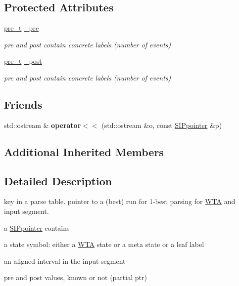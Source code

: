 \subsection*{Protected Attributes}
\begin{DoxyCompactItemize}
\item 
\mbox{\hyperlink{group__general_ga092fe8b972dfa977c2a0886720a7731e}{pre\+\_\+t}} \mbox{\hyperlink{classSIPpointer_acfbd9084ef6db9de5776896247ac71c8}{\+\_\+pre}}
\begin{DoxyCompactList}\small\item\em pre and post contain concrete labels (number of events) \end{DoxyCompactList}\item 
\mbox{\hyperlink{group__general_ga092fe8b972dfa977c2a0886720a7731e}{pre\+\_\+t}} \mbox{\hyperlink{classSIPpointer_ab8ae3255dd4e6f898db0c5e49c860f28}{\+\_\+post}}
\begin{DoxyCompactList}\small\item\em pre and post contain concrete labels (number of events) \end{DoxyCompactList}\end{DoxyCompactItemize}
\subsection*{Friends}
\begin{DoxyCompactItemize}
\item 
\mbox{\label{classSIPpointer_a7576e987b23cc05f8c50602b5fbe5fe3}} 
std\+::ostream \& {\bfseries operator$<$$<$} (std\+::ostream \&o, const \mbox{\hyperlink{classSIPpointer}{S\+I\+Ppointer}} \&p)
\end{DoxyCompactItemize}
\subsection*{Additional Inherited Members}


\subsection{Detailed Description}
key in a parse table. pointer to a (best) run for 1-\/best parsing for \mbox{\hyperlink{classWTA}{W\+TA}} and input segment. 

a \mbox{\hyperlink{classSIPpointer}{S\+I\+Ppointer}} contains
\begin{DoxyItemize}
\item a state symbol\+: either a \mbox{\hyperlink{classWTA}{W\+TA}} state or a meta state or a leaf label
\item an aligned interval in the input segment
\item pre and post values, known or not (partial ptr) 
\end{DoxyItemize}

